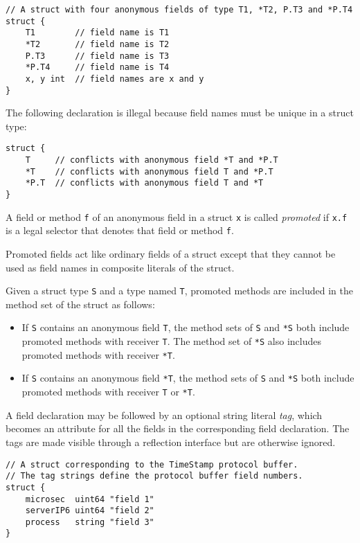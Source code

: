 \begin{Verbatim}[frame=single]
// A struct with four anonymous fields of type T1, *T2, P.T3 and *P.T4
struct {
    T1        // field name is T1
    *T2       // field name is T2
    P.T3      // field name is T3
    *P.T4     // field name is T4
    x, y int  // field names are x and y
}
\end{Verbatim}

The following declaration is illegal because field names must be unique
in a struct type:

\begin{Verbatim}[frame=single]
struct {
    T     // conflicts with anonymous field *T and *P.T
    *T    // conflicts with anonymous field T and *P.T
    *P.T  // conflicts with anonymous field T and *T
}
\end{Verbatim}

A field or method \texttt{f} of an
anonymous field in a struct \texttt{x} is called \emph{promoted} if
\texttt{x.f} is a legal selector that denotes that
field or method \texttt{f}.

Promoted fields act like ordinary fields of a struct except that they
cannot be used as field names in
composite literals of the struct.

Given a struct type \texttt{S} and a type named \texttt{T}, promoted
methods are included in the method set of the struct as follows:

\begin{itemize}
\item
  If \texttt{S} contains an anonymous field \texttt{T}, the
  method sets of \texttt{S} and \texttt{*S}
  both include promoted methods with receiver \texttt{T}. The method set
  of \texttt{*S} also includes promoted methods with receiver
  \texttt{*T}.
\item
  If \texttt{S} contains an anonymous field \texttt{*T}, the method sets
  of \texttt{S} and \texttt{*S} both include promoted methods with
  receiver \texttt{T} or \texttt{*T}.
\end{itemize}

A field declaration may be followed by an optional string literal
\emph{tag}, which becomes an attribute for all the fields in the
corresponding field declaration. The tags are made visible through a
reflection interface but are otherwise
ignored.

\begin{Verbatim}[frame=single]
// A struct corresponding to the TimeStamp protocol buffer.
// The tag strings define the protocol buffer field numbers.
struct {
    microsec  uint64 "field 1"
    serverIP6 uint64 "field 2"
    process   string "field 3"
}
\end{Verbatim}

